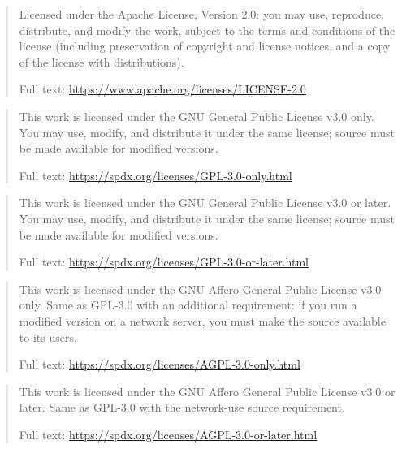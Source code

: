 \expandafter\def\csname qdissertation@licensetext@Apache-2.0\endcsname{%
  \begin{quote}\small\raggedright
    Licensed under the Apache License, Version 2.0: you may use, reproduce, distribute, and modify the work, subject to the terms and conditions of the license (including preservation of copyright and license notices, and a copy of the license with distributions).

    Full text: \url{https://www.apache.org/licenses/LICENSE-2.0}
  \end{quote}%
}
\expandafter\def\csname qdissertation@licensetext@GPL-3.0-only\endcsname{%
  \begin{quote}\small\raggedright
    This work is licensed under the GNU General Public License v3.0 only. You may use, modify, and distribute it under the same license; source must be made available for modified versions.

    Full text: \url{https://spdx.org/licenses/GPL-3.0-only.html}
  \end{quote}%
}
\expandafter\def\csname qdissertation@licensetext@GPL-3.0-or-later\endcsname{%
  \begin{quote}\small\raggedright
    This work is licensed under the GNU General Public License v3.0 or later. You may use, modify, and distribute it under the same license; source must be made available for modified versions.

    Full text: \url{https://spdx.org/licenses/GPL-3.0-or-later.html}
  \end{quote}%
}
\expandafter\def\csname qdissertation@licensetext@AGPL-3.0-only\endcsname{%
  \begin{quote}\small\raggedright
    This work is licensed under the GNU Affero General Public License v3.0 only. Same as GPL-3.0 with an additional requirement: if you run a modified version on a network server, you must make the source available to its users.

    Full text: \url{https://spdx.org/licenses/AGPL-3.0-only.html}
  \end{quote}%
}
\expandafter\def\csname qdissertation@licensetext@AGPL-3.0-or-later\endcsname{%
  \begin{quote}\small\raggedright
    This work is licensed under the GNU Affero General Public License v3.0 or later. Same as GPL-3.0 with the network-use source requirement.

    Full text: \url{https://spdx.org/licenses/AGPL-3.0-or-later.html}
  \end{quote}%
}
